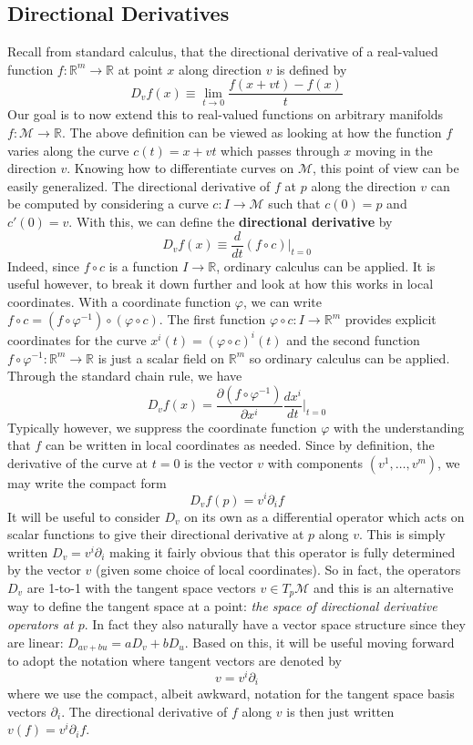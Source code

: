 \documentclass[onecolumn]{gwclass}
\newcommand{\man}{\mathcal{M}}
\newcommand{\R}{\mathbb{R}}
\begin{document}
	\subsection{Directional Derivatives}
	
	Recall from standard calculus, that the directional derivative of a real-valued function $f:\R^m\to\R$ at point $x$ along direction $v$ is defined by
	$$ D_vf(x) \equiv \lim_{t\to 0}\frac{f(x+vt) - f(x)}{t}$$ 
	Our goal is to now extend this to real-valued functions on arbitrary manifolds $f:\man\to\R$. The above definition can be viewed as looking at how the function $f$ varies along the curve $c(t)=x+vt$ which passes through $x$ moving in the direction $v$. Knowing how to differentiate curves on $\man$, this point of view can be easily generalized. The directional derivative of $f$ at $p$ along the direction $v$ can be computed by considering a curve $c:I\to\man$ such that $c(0)=p$ and $c'(0)=v$. With this, we can define the \textbf{directional derivative} by
	$$ D_vf(x) \equiv \frac{d}{dt}(f\circ c)\big|_{t=0} $$ 
	Indeed, since $f\circ c$ is a function $I\to \R$, ordinary calculus can be applied. It is useful however, to break it down further and look at how this works in local coordinates. With a coordinate function $\varphi$, we can write $f\circ c = (f\circ \varphi^{-1})\circ(\varphi\circ c)$. The first function $\varphi\circ c:I\to\R^m$ provides explicit coordinates for the curve $x^i(t)=(\varphi\circ c)^i(t)$ and the second function $f\circ\varphi^{-1}:\R^m\to \R$ is just a scalar field on $\R^m$ so ordinary calculus can be applied. Through the standard chain rule, we have
	$$ D_vf(x) = \frac{\partial(f\circ\varphi^{-1})}{\partial x^i}\frac{dx^i}{dt}\bigg|_{t=0} $$
	Typically however, we suppress the coordinate function $\varphi$ with the understanding that $f$ can be written in local coordinates as needed. Since by definition, the derivative of the curve at $t=0$ is the vector $v$ with components $(v^1,\dots, v^m)$, we may write the compact form
	$$ D_vf(p) = v^i \partial_i f$$
	It will be useful to consider $D_v$ on its own as a differential operator which acts on scalar functions to give their directional derivative at $p$ along $v$. This is simply written $D_v = v^i\partial_i$ making it fairly obvious that this operator is fully determined by the vector $v$ (given some choice of local coordinates). So in fact, the operators $D_v$ are 1-to-1 with the tangent space vectors $v\in T_p\man$ and this is an alternative way to define the tangent space at a point: \emph{the space of directional derivative operators at $p$}. In fact they also naturally have a vector space structure since they are linear: $D_{av+bu}=aD_v + bD_u$. Based on this, it will be useful moving forward to adopt the notation where tangent vectors are denoted by
	$$ v = v^i\partial_i $$
	where we use the compact, albeit awkward, notation for the tangent space basis vectors $\partial_i$. The directional derivative of $f$ along $v$ is then just written $v(f)=v^i\partial_if$.
	
\end{document}
